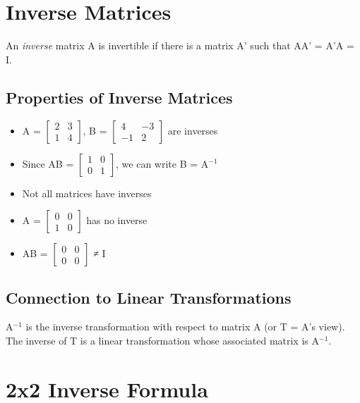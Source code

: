 \documentclass[12pt,a4paper]{article}
\begin{document}
\section{Inverse Matrices}

An \textit{inverse} matrix A is invertible if there is a matrix A' such that AA' = A'A = I.

\subsection{Properties of Inverse Matrices}

\begin{itemize}
    \item A = $\begin{bmatrix} 2 & 3 \\ 1 & 4 \end{bmatrix}$, B = $\begin{bmatrix} 4 & -3 \\ -1 & 2 \end{bmatrix}$ are inverses
    \item Since AB = $\begin{bmatrix} 1 & 0 \\ 0 & 1 \end{bmatrix}$, we can write B = A$^{-1}$
    \item Not all matrices have inverses
    \item A = $\begin{bmatrix} 0 & 0 \\ 1 & 0 \end{bmatrix}$ has no inverse
    \item AB = $\begin{bmatrix} 0 & 0 \\ 0 & 0 \end{bmatrix}$ ≠ I
\end{itemize}

\subsection{Connection to Linear Transformations}

A$^{-1}$ is the inverse transformation with respect to matrix A (or T = A's view). The inverse of T is a linear transformation whose associated matrix is A$^{-1}$.

\section{2x2 Inverse Formula}
\end{document}
